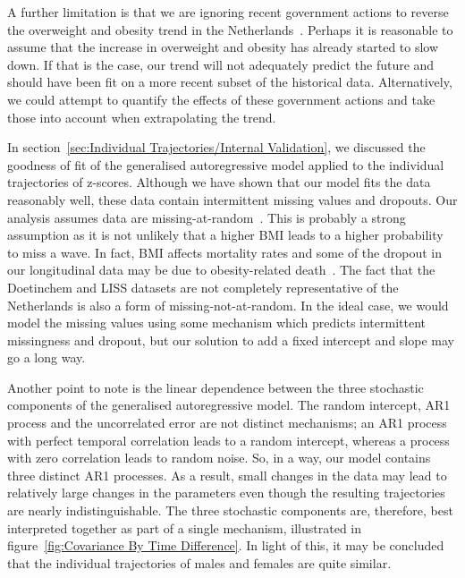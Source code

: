 \documentclass{imammb}
\numberwithin{equation}{section}
\begin{document}
A further limitation is that we are ignoring recent government actions to reverse the overweight and obesity trend in the Netherlands~\citep{VWS2018, VanRinsum2018}. Perhaps it is reasonable to assume that the increase in overweight and obesity has already started to slow down. If that is the case, our trend will not adequately predict the future and should have been fit on a more recent subset of the historical data. Alternatively, we could attempt to quantify the effects of these government actions and take those into account when extrapolating the trend.

In section~\ref{sec:Individual Trajectories/Internal Validation}, we discussed the goodness of fit of the generalised autoregressive model applied to the individual trajectories of z-scores. Although we have shown that our model fits the data reasonably well, these data contain intermittent missing values and dropouts. Our analysis assumes data are missing-at-random~\citep{Diggle1994, Verbeke2000}. This is probably a strong assumption as it is not unlikely that a higher BMI leads to a higher probability to miss a wave. In fact, BMI affects mortality rates and some of the dropout in our longitudinal data may be due to obesity-related death~\citep{Hoogenveen2000}. The fact that the Doetinchem and LISS datasets are not completely representative of the Netherlands is also a form of missing-not-at-random. In the ideal case, we would model the missing values using some mechanism which predicts intermittent missingness and dropout, but our solution to add a fixed intercept and slope may go a long way.

Another point to note is the linear dependence between the three stochastic components of the generalised autoregressive model. The random intercept, AR1 process and the uncorrelated error are not distinct mechanisms; an AR1 process with perfect temporal correlation leads to a random intercept, whereas a process with zero correlation leads to random noise. So, in a way, our model contains three distinct AR1 processes. As a result, small changes in the data may lead to relatively large changes in the parameters even though the resulting trajectories are nearly indistinguishable. The three stochastic components are, therefore, best interpreted together as part of a single mechanism, illustrated in figure~\ref{fig:Covariance By Time Difference}. In light of this, it may be concluded that the individual trajectories of males and females are quite similar.
\end{document}
